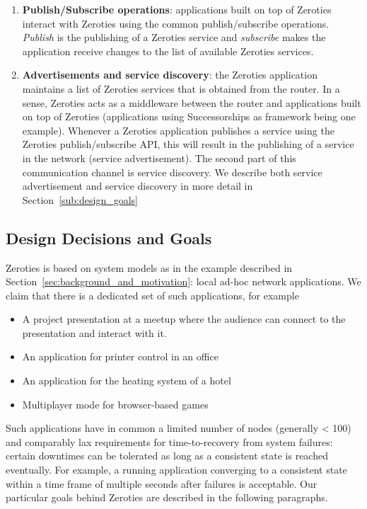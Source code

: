 \begin{enumerate}
\item \textbf{Publish/Subscribe operations}: applications built on top of Zeroties interact with Zeroties using the common publish/subscribe operations.
\textit{Publish} is the publishing of a Zeroties service and \textit{subscribe} makes the application receive changes to the list of available Zeroties services. 

\item \textbf{Advertisements and service discovery}: the Zeroties application maintains a list of Zeroties services that is obtained from the router.
In a sense, Zeroties acts as a middleware between the router and applications built on top of Zeroties (applications using Successorships as framework being one example). 
Whenever a Zeroties application publishes a service using the Zeroties publish/subscribe API, this will result in the publishing of a service in the network (service advertisement). 
The second part of this communication channel is service discovery.
We describe both service advertisement and service discovery in more detail in Section~\ref{sub:design_goals}
\end{enumerate}


\subsection{Design Decisions and Goals}
\label{sub:design}

Zeroties is based on system models as in the example described in Section~\ref{sec:background_and_motivation}: local ad-hoc network applications. We claim that there is a dedicated set of such applications, for example
\begin{itemize}
\item A project presentation at a meetup where the audience can connect to the presentation and interact with it.
\item An application for printer control in an office
\item An application for the heating system of a hotel
\item Multiplayer mode for browser-based games
\end{itemize}

Such applications have in common a limited number of nodes (generally < 100) and comparably lax requirements for time-to-recovery from system failures: certain downtimes can be tolerated as long as a consistent state is reached eventually.
For example, a running application converging to a consistent state within a time frame of multiple seconds after failures is acceptable.
Our particular goals behind Zeroties are described in the following paragraphs.

